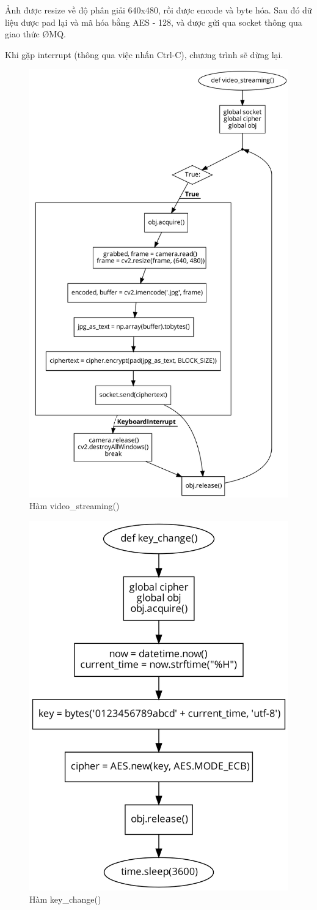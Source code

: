 \documentclass{article}
\begin{document}
Ảnh được resize về độ phân giải 640x480, rồi được encode và byte hóa. Sau đó dữ liệu được pad lại và mã hóa bằng AES - 128, và được gửi qua socket thông qua giao thức \O MQ.

Khi gặp interrupt (thông qua việc nhấn Ctrl-C), chương trình sẽ dừng lại.

\begin{figure}[H]
    \centering
    \includegraphics[width=0.6\linewidth]{video_streaming.png}
    \caption{Hàm video\_streaming()}
    \label{video_streaming}
\end{figure}

\break

\begin{figure}[H]
    \centering
    \includegraphics[width=0.6\linewidth]{key_change.png}
    \caption{Hàm key\_change()}
    \label{key_change}
\end{figure}
\end{document}
